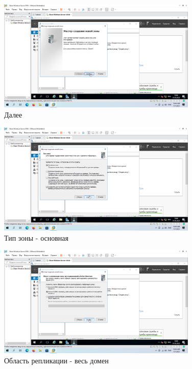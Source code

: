 \documentclass[a4paper]{article}
\begin{document}
  \begin{figure}[H]
    \centering
    \includegraphics[width=0.85\textwidth]{9_0078}
    \caption{Далее}
    \label{img:0078}
  \end{figure}

  \begin{figure}[H]
    \centering
    \includegraphics[width=0.85\textwidth]{9_0079}
    \caption{Тип зоны - основная}
    \label{img:0079}
  \end{figure}

  \begin{figure}[H]
    \centering
    \includegraphics[width=0.85\textwidth]{9_0080}
    \caption{Область репликации - весь домен}
    \label{img:0080}
  \end{figure}
\end{document}
